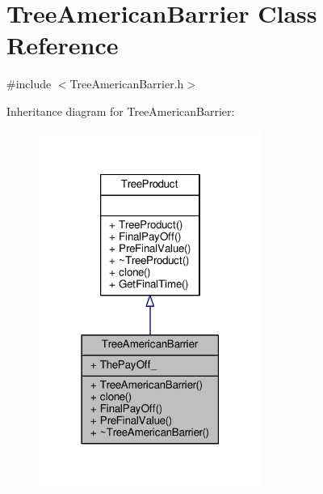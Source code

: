 \hypertarget{classTreeAmericanBarrier}{}\section{Tree\+American\+Barrier Class Reference}
\label{classTreeAmericanBarrier}


{\ttfamily \#include $<$Tree\+American\+Barrier.\+h$>$}



Inheritance diagram for Tree\+American\+Barrier\+:
\nopagebreak
\begin{figure}[H]
\begin{center}
\leavevmode
\includegraphics[width=207pt]{classTreeAmericanBarrier__inherit__graph}
\end{center}
\end{figure}


